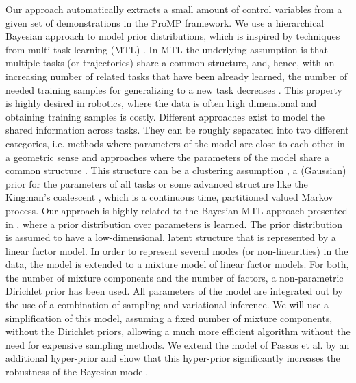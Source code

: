 \documentclass[letterpaper, 10 pt, conference]{ieeeconf}  %
\begin{document}
Our approach automatically extracts a small amount of control variables from a given set of demonstrations in the ProMP framework. 
We use a hierarchical Bayesian approach to model prior distributions, which is inspired by techniques from multi-task learning (MTL) \cite{yu05,lazaric10,daume12,ruvolo14}.
In MTL the underlying assumption is that multiple tasks (or trajectories) share a common structure, and, hence, with 
an increasing number of related tasks that have been already learned, the number of needed training samples for generalizing to a new task decreases \cite{baxter00}. 
This property is highly desired in robotics, where the data is often high dimensional and obtaining training samples is costly.
Different approaches exist to model the shared information across tasks. They can be roughly separated into two different categories, i.e. 
methods where parameters of the model are close to each other in a geometric sense \cite{evgeniou04,ruvolo14} and approaches 
where the parameters of the model share a common structure \cite{yu05,xue07,daume09,lazaric10,rai10,passos12}. 
This structure can be a clustering assumption \cite{xue07}, a (Gaussian) prior for the parameters of all tasks \cite{yu05,lazaric10} 
or some advanced structure like the Kingman's coalescent \cite{daume09}, which is a continuous time, partitioned valued Markov process. 
Our approach is highly related to the Bayesian MTL approach presented in \cite{passos12}, 
where a prior distribution over parameters is learned. 
The prior distribution is assumed to have a low-dimensional, latent structure that is represented by a linear factor model. In 
 order to represent several modes (or non-linearities) in the data, the model is extended to a mixture model of linear factor models.
 For both, the number of mixture components and the number of factors, a non-parametric Dirichlet prior has been used.
 All parameters of the model are integrated out by the use of a combination of sampling and variational inference. 
 We will use a simplification of this model, assuming a fixed number of mixture components, without the Dirichlet priors, 
 allowing a much more efficient algorithm without the need for expensive sampling methods. 
 We extend the model of Passos et al. by an additional hyper-prior and show that this hyper-prior significantly increases the robustness of the Bayesian model.
 
\end{document}
